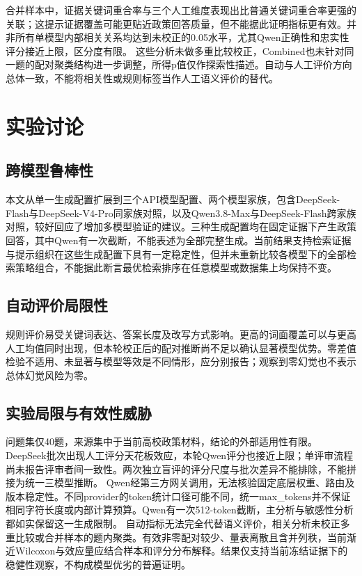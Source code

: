 合并样本中，证据关键词重合率与三个人工维度表现出比普通关键词重合率更强的关联；这提示证据覆盖可能更贴近政策回答质量，但不能据此证明指标更有效。并非所有单模型内部相关关系均达到未校正的0.05水平，尤其Qwen正确性和忠实性评分接近上限，区分度有限。
这些分析未做多重比较校正，Combined也未针对同一题的配对聚类结构进一步调整，所得p值仅作探索性描述。自动与人工评价方向总体一致，不能将相关性或规则标签当作人工语义评价的替代。

\section{实验讨论}
\label{sec:cm-discussion}
\subsection{跨模型鲁棒性}
本文从单一生成配置扩展到三个API模型配置、两个模型家族，包含DeepSeek-Flash与DeepSeek-V4-Pro同家族对照，以及Qwen3.8-Max与DeepSeek-Flash跨家族对照，较好回应了增加多模型验证的建议。三种生成配置均在固定证据下产生政策回答，其中Qwen有一次截断，不能表述为全部完整生成。当前结果支持检索证据与提示组织在这些生成配置下具有一定稳定性，但并未重新比较各模型下的全部检索策略组合，不能据此断言最优检索排序在任意模型或数据集上均保持不变。
\subsection{自动评价局限性}
规则评价易受关键词表达、答案长度及改写方式影响。更高的词面覆盖可以与更高人工均值同时出现，但本轮校正后的配对推断尚不足以确认显著模型优势。零差值检验不适用、未显著与模型等效是不同情形，应分别报告；观察到零幻觉也不表示总体幻觉风险为零。
\subsection{实验局限与有效性威胁}
问题集仅40题，来源集中于当前高校政策材料，结论的外部适用性有限。DeepSeek批次出现人工评分天花板效应，本轮Qwen评分也接近上限；单评审流程尚未报告评审者间一致性。两次独立盲评的评分尺度与批次差异不能排除，不能拼接为统一三模型推断。
Qwen经第三方网关调用，无法核验固定底层权重、路由及版本稳定性。不同provider的token统计口径可能不同，统一max\_tokens并不保证相同字符长度或内部计算预算。Qwen有一次512-token截断，主分析与敏感性分析都如实保留这一生成限制。
自动指标无法完全代替语义评价，相关分析未校正多重比较或合并样本的题内聚类。有效非零配对较少、量表离散且含并列秩，当前渐近Wilcoxon与效应量应结合样本和评分分布解释。结果仅支持当前冻结证据下的稳健性观察，不构成模型优劣的普遍证明。
